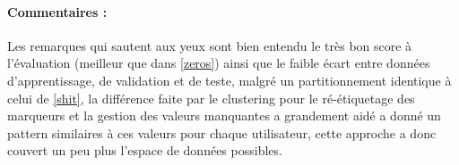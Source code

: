 \begin{table}[H]
	\centering
	\caption{Meilleures architectures sur les données de teste pour l'approche avec Clustering (\ref{clusterApproache}) avec partitionnement one-user-left(\ref{oneLeftLearning})}
\end{table}
\paragraph{Commentaires :	}
Les remarques qui sautent aux yeux sont bien entendu le très bon score à l'évaluation (meilleur que dans \ref{zeros}) ainsi que le faible écart entre données d'apprentissage, de validation et de teste, malgré un partitionnement identique à celui de \ref{shit}, la différence faite par le clustering pour le ré-étiquetage des marqueurs et la gestion des valeurs manquantes a grandement aidé a donné un pattern similaires à ces valeurs pour chaque utilisateur, cette approche a donc couvert un peu plus l'espace de données possibles.